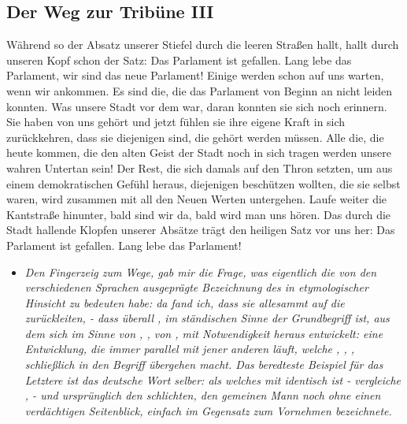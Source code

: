 \documentclass[a4paper, 12pt]{report}
\begin{document}
\subsection{Der Weg zur Tribüne III}
Während so der Absatz unserer Stiefel durch die leeren Straßen hallt, hallt durch unseren Kopf schon der Satz:
\glqq Das Parlament ist gefallen. Lang lebe das Parlament, wir sind das neue Parlament!\grqq{}
Einige werden schon auf uns warten, wenn wir ankommen.
Es sind die, die das Parlament von Beginn an nicht leiden konnten.
Was unsere Stadt vor dem war, daran konnten sie sich noch erinnern. 
Sie haben von uns gehört und jetzt fühlen sie ihre eigene Kraft in sich zurückkehren, dass sie diejenigen sind, die gehört werden müssen.
Alle die, die heute kommen, die den alten Geist der Stadt noch in sich tragen werden unsere wahren Untertan sein!
Der Rest, die sich damals auf den Thron setzten, um aus einem demokratischen Gefühl heraus, diejenigen beschützen wollten, die sie selbst waren, wird zusammen mit all den \glqq Neuen Werten\grqq{} untergehen. 
Laufe weiter die Kantstraße hinunter, bald sind wir da, bald wird man uns hören. 
Das durch die Stadt hallende Klopfen unserer Absätze trägt den heiligen Satz vor uns her: 
\glqq Das Parlament ist gefallen. Lang lebe das Parlament!\grqq\\
\begin{itemize}
    \item[] \em
    Den Fingerzeig zum  Wege, gab mir die Frage, was eigentlich die von den verschiedenen Sprachen ausgeprägte Bezeichnung des  in etymologischer Hinsicht zu bedeuten habe: 
    da fand ich, dass sie allesammt auf die  zurückleiten, - dass überall ,  im ständischen Sinne der Grundbegriff ist, aus dem sich  im Sinne von , , von ,  mit Notwendigkeit heraus entwickelt: eine Entwicklung, die immer parallel mit jener anderen läuft, welche , , , schließlich in den Begriff  übergehen macht. 
    Das beredteste Beispiel für das Letztere ist das deutsche Wort  selber: 
    als welches mit  identisch ist - vergleiche ,  - und ursprünglich den schlichten, den gemeinen Mann noch ohne einen verdächtigen Seitenblick, einfach im Gegensatz zum Vornehmen bezeichnete.
\end{itemize}
\end{document}
